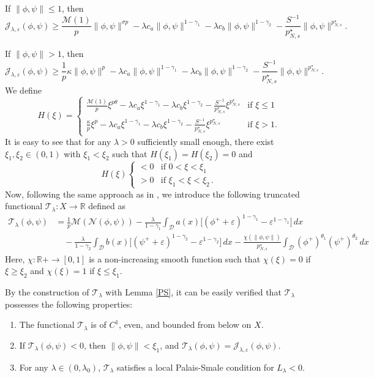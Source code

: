 \documentclass[reqno]{amsart}
\begin{document}
If $\| \phi,\psi \|\leq 1$, then
$$\mathcal{J}_{\lambda,\varepsilon}(\phi,\psi)\geq \frac{\mathscr{M}(1)}{p}\| \phi,\psi \|^{\sigma p}- \lambda c_a\| \phi,\psi\|^{1-\gamma_1}-\lambda c_b\| \phi,\psi\|^{1-\gamma_2}-\frac{S^{-1}}{p^\star_{N,s}}\| \phi,\psi\|^{p^\star_{N,s}}.$$

If $\| \phi,\psi \|> 1$, then
$$
\mathcal{J}_{\lambda,\varepsilon}(\phi,\psi)\geq \frac{1}{p}\kappa\| \phi,\psi\|^p
- \lambda c_a\| \phi,\psi\|^{1-\gamma_1}-\lambda c_b\| \phi,\psi\|^{1-\gamma_2}
-\frac{S^{-1}}{p^\star_{N,s}}\| \phi,\psi\|^{p^\star_{N,s}}.
$$
We define
\[
H(\xi)=
\begin{cases}
\frac{\mathscr{M}(1)}{p}\xi^{p\theta}-\lambda c_a\xi^{1-\gamma_1}
 -\lambda c_b\xi^{1-\gamma_2}-\frac{S^{-1}}{p^\star_{N,s}}\xi^{p^\star_{N,s}} 
 & \text{if } \xi\leq 1\\[4pt]
\frac{\kappa}{p} \xi^p-\lambda c_a\xi^{1-\gamma_1}-\lambda c_b\xi^{1-\gamma_2}
-\frac{S^{-1}}{p^\star_{N,s}}\xi^{p^\star_{N,s}}& \text{if } \xi> 1.
\end{cases}
\]
It is easy to see that for any $\lambda>0$ sufficiently small enough, there exist 
$\xi_1,\xi_2\in (0,1)$ with $\xi_1<\xi_2$ such that $H(\xi_1)=H(\xi_2)=0$ and
\[
H(\xi) \begin{cases}
<0 & \text{if } 0<\xi<\xi_1\\
>0 & \text{if } \xi_1<\xi<\xi_2\,.
\end{cases}
\]
Now, following the same approach as in \cite{t9}, we introduce the following truncated 
functional $\mathcal{T}_\lambda:X\to \mathbb{R}$ defined as
\begin{align*}
\mathcal{T}_\lambda(\phi,\psi)
&=\frac{1}{p}\mathscr{M}(\mathcal{N}(\phi,\psi))
 -\frac{\lambda}{1-\gamma_1}\int_\mathcal{D} a(x)\Big[(\phi^++\varepsilon)^{1-\gamma_1}
 -\varepsilon^{1-\gamma_1}\Big]\,dx\\
&\quad -\frac{\lambda}{1-\gamma_2}\int_\mathcal{D} b(x)\Big[(\psi^+
 +\varepsilon)^{1-\gamma_2}-\varepsilon^{1-\gamma_2}\Big]\,dx
 -\frac{\chi(\| \phi,\psi\|)}{p^\star_{N,s}}\int_\mathcal{D} 
  (\phi^+)^{\theta_1}(\psi^+)^{\theta_2}\,dx
\end{align*}
Here, $\chi:\mathbb{R}+\to [0,1]$ is a non-increasing smooth function such that
$\chi(\xi)=0$ if $\xi\geq \xi_2$ and $\chi(\xi)=1$ if $\xi\leq \xi_1$.

By the construction of $\mathcal{T}_\lambda$ with Lemma \ref{PS}, it can be easily 
verified that $\mathcal{T}_\lambda$ possesses the following properties:
\begin{lemma}\label{L1}
\begin{enumerate}
\item The functional $\mathcal{T}_\lambda$ is of $C^1$, even, and bounded from below 
on $X$.

\item If $\mathcal{T}_\lambda(\phi,\psi)< 0$, then $\| \phi,\psi\|< \xi_1$, and 
$\mathcal{T}_\lambda(\phi,\psi)=\mathcal{J}_{\lambda,\varepsilon}(\phi,\psi)$.

\item For any $\lambda\in (0,\lambda_0)$, $\mathcal{T}_\lambda$ satisfies a local 
Palais-Smale condition for $L_\lambda<0$.
\end{enumerate}
\end{lemma}
\end{document}
